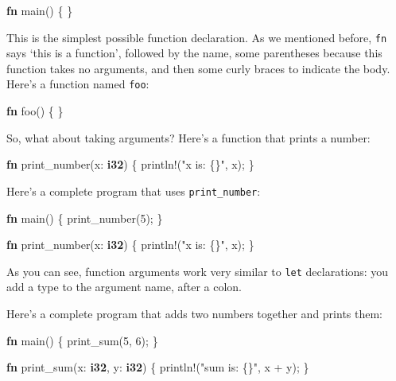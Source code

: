 \documentclass[a4paper,]{book}
\newenvironment{Shaded}{\begin{snugshade}}{\end{snugshade}}
\newcommand{\KeywordTok}[1]{\textcolor[rgb]{0.13,0.29,0.53}{\textbf{{#1}}}}
\newcommand{\DecValTok}[1]{\textcolor[rgb]{0.00,0.00,0.81}{{#1}}}
\newcommand{\StringTok}[1]{\textcolor[rgb]{0.31,0.60,0.02}{{#1}}}
\newcommand{\OtherTok}[1]{\textcolor[rgb]{0.56,0.35,0.01}{{#1}}}
\newcommand{\NormalTok}[1]{{#1}}
\begin{document}
\begin{Shaded}
\begin{Highlighting}[]
\KeywordTok{fn} \NormalTok{main() \{}
\NormalTok{\}}
\end{Highlighting}
\end{Shaded}

This is the simplest possible function declaration. As we mentioned
before, \texttt{fn} says `this is a function', followed by the name,
some parentheses because this function takes no arguments, and then some
curly braces to indicate the body. Here's a function named \texttt{foo}:

\begin{Shaded}
\begin{Highlighting}[]
\KeywordTok{fn} \NormalTok{foo() \{}
\NormalTok{\}}
\end{Highlighting}
\end{Shaded}

So, what about taking arguments? Here's a function that prints a number:

\begin{Shaded}
\begin{Highlighting}[]
\KeywordTok{fn} \NormalTok{print_number(x: }\KeywordTok{i32}\NormalTok{) \{}
    \OtherTok{println!}\NormalTok{(}\StringTok{"x is: \{\}"}\NormalTok{, x);}
\NormalTok{\}}
\end{Highlighting}
\end{Shaded}

Here's a complete program that uses \texttt{print\_number}:

\begin{Shaded}
\begin{Highlighting}[]
\KeywordTok{fn} \NormalTok{main() \{}
    \NormalTok{print_number(}\DecValTok{5}\NormalTok{);}
\NormalTok{\}}

\KeywordTok{fn} \NormalTok{print_number(x: }\KeywordTok{i32}\NormalTok{) \{}
    \OtherTok{println!}\NormalTok{(}\StringTok{"x is: \{\}"}\NormalTok{, x);}
\NormalTok{\}}
\end{Highlighting}
\end{Shaded}

As you can see, function arguments work very similar to \texttt{let}
declarations: you add a type to the argument name, after a colon.

Here's a complete program that adds two numbers together and prints
them:

\begin{Shaded}
\begin{Highlighting}[]
\KeywordTok{fn} \NormalTok{main() \{}
    \NormalTok{print_sum(}\DecValTok{5}\NormalTok{, }\DecValTok{6}\NormalTok{);}
\NormalTok{\}}

\KeywordTok{fn} \NormalTok{print_sum(x: }\KeywordTok{i32}\NormalTok{, y: }\KeywordTok{i32}\NormalTok{) \{}
    \OtherTok{println!}\NormalTok{(}\StringTok{"sum is: \{\}"}\NormalTok{, x + y);}
\NormalTok{\}}
\end{Highlighting}
\end{Shaded}
\end{document}
